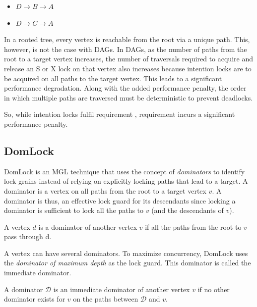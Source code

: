 \begin{itemize}
    \item $D \rightarrow B \rightarrow A$
    \item $D \rightarrow C \rightarrow A$
\end{itemize}




In a rooted tree, every vertex is reachable from the root via a unique path. 
This, however, is not the case with DAGs.
In DAGs, as the number of paths from the root to a target vertex increases, the number of traversals required to acquire and release an S or X lock on that vertex also increases because intention locks are to be acquired on all paths to the target vertex.
This leads to a significant performance degradation. Along with the added performance penalty, the order in which multiple paths are traversed must be deterministic to prevent deadlocks.  

So, while intention locks fulfil requirement \Rb, requirement \Rc incurs a significant performance penalty. 

\subsection{DomLock}
DomLock \cite{kalikar2016domlock} is an MGL technique that uses the concept of \emph{dominators} to identify lock grains instead of relying on explicitly locking paths that lead to a target. A dominator is a vertex on all paths from the root to a target vertex $v$. A dominator is thus, an effective lock guard for its descendants since locking a dominator is sufficient to lock all the paths to $v$ (and the descendants of $v$).

\begin{definition}
    A vertex $d$ is a dominator of another vertex $v$ if all the paths from the root to $v$ pass through d.
\end{definition}

A vertex can have several dominators. 
To maximize concurrency, DomLock uses the \emph{dominator of maximum depth} as the lock guard. This dominator is called the immediate dominator. 


\begin{definition}
    A dominator $\mathcal{D}$ is an immediate dominator of another vertex $v$ if no other dominator exists for $v$ on the paths between $\mathcal{D}$ and $v$.
\end{definition}

